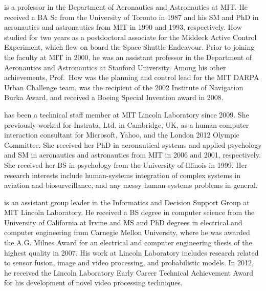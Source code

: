 \documentclass[dvipdfmx,uplatex,useotf]{dmubookJ}
\begin{document}
\begin{abouttheauthors}
\newpage

 is a professor in the Department of Aeronautics and Astronautics at MIT. He received a BA Sc from the University of Toronto in 1987 and his SM and PhD in aeronautics and astronautics from MIT in 1990 and 1993, respectively. How studied for two years as a postdoctoral associate for the Middeck Active Control Experiment, which flew on board the Space Shuttle Endeavour. Prior to joining the faculty at MIT in 2000, he was an assistant professor in the Department of Aeronautics and Astronautics at Stanford University. Among his other achievements, Prof.~How was the planning and control lead for the MIT DARPA Urban Challenge team, was the recipient of the 2002 Institute of Navigation Burka Award, and received a Boeing Special Invention award in 2008. %


 has been a technical staff member at MIT Lincoln Laboratory since 2009.  She previously worked for Instrata, Ltd. in Cambridge, UK, as a human-computer interaction consultant for Microsoft, Yahoo, and the London 2012 Olympic Committee.  She received her PhD in aeronautical systems and applied psychology and SM in aeronautics and astronautics from MIT in 2006 and 2001, respectively.  She received her BS in psychology from the University of Illinois in 1999.  Her research interests include human-systems integration of complex systems in aviation and biosurveillance, and any messy human-systems problems in general.  

 is an assistant group leader in the Informatics and Decision Support Group at MIT Lincoln Laboratory.  He received a BS degree in computer science from the University of California at Irvine and MS and PhD degrees in electrical and computer engineering from Carnegie Mellon University, where he was awarded the A.G. Milnes Award for an electrical and computer engineering thesis of the highest quality in 2007.  His work at Lincoln Laboratory includes research related to sensor fusion, image and video processing, and probabilistic models.  In 2012, he received the Lincoln Laboratory Early Career Technical Achievement Award for his development of novel video processing techniques.

\newpage


\end{abouttheauthors}
\end{document}
